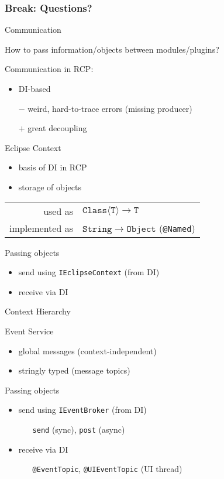\documentclass{beamer}
\newcommand{\eg}{\textcolor{pumpkin}{\raisebox{-0.5mm}{\HandRight}}}
\newcommand{\breakframe}{\begin{fillerframe}\frametitle{Break: Questions?}\end{fillerframe}}
\newenvironment{centerblock}{\begin{block}{}\begin{center}}{\end{center}\end{block}}
\newcommand{\ttt}[1]{\texttt{\color{honey}#1}}
\newcommand{\mtt}[1]{\ensuremath{\mathtt{#1}}}
\newcommand{\singleindent}[1]{\begin{itemize}\item[] #1\end{itemize}}
\begin{document}
\breakframe

\begin{frame}{Communication}%
	\begin{centerblock}How to pass information/objects between modules/plugins?\end{centerblock}

	\medskip

	Communication in RCP:
	\begin{itemize}
		\item DI-based
		\item[$-$] weird, hard-to-trace errors (missing producer)
		\item[$+$] great decoupling
	\end{itemize}
\end{frame}%
\begin{frame}{Eclipse Context}%
	\begin{itemize}
		\item basis of DI in RCP
		\item storage of objects
	\end{itemize}
	\begin{centerblock}\begin{tabular}{rl}
		used as & $\mtt{Class\langle T\rangle}\to\mtt{T}$\\
		implemented as & $\mtt{String} \to \mtt{Object}$ (\ttt{@Named})\\
	\end{tabular}\end{centerblock}
	Passing objects \eg
	\begin{itemize}
		\item send using \ttt{IEclipseContext} (from DI)
		\item receive via DI
	\end{itemize}
\end{frame}%
\begin{frame}{Context Hierarchy}

\end{frame}
\begin{frame}{Event Service}%
	\begin{itemize}
		\item global messages (context-independent)
		\item stringly typed (message topics)
	\end{itemize}

	\medskip

	Passing objects \eg
	\begin{itemize}
		\item send using \ttt{IEventBroker} (from DI)
			\singleindent{\ttt{send} (sync), \ttt{post} (async)}
		\item receive via DI
			\singleindent{\ttt{@EventTopic}, \ttt{@UIEventTopic} (UI thread)}
	\end{itemize}
\end{frame}%
\end{document}
